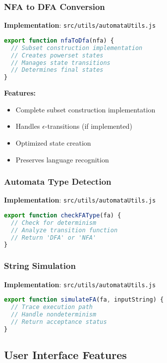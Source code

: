 \documentclass[12pt]{article}
\begin{document}
\subsubsection{NFA to DFA Conversion}
\textbf{Implementation}: \texttt{src/utils/automataUtils.js}
\begin{lstlisting}[language=JavaScript]
export function nfaToDfa(nfa) {
  // Subset construction implementation
  // Creates powerset states
  // Manages state transitions
  // Determines final states
}
\end{lstlisting}
\textbf{Features:}
\begin{itemize}
    \item Complete subset construction implementation
    \item Handles $\epsilon$-transitions (if implemented)
    \item Optimized state creation
    \item Preserves language recognition
\end{itemize}

\subsubsection{Automata Type Detection}
\textbf{Implementation}: \texttt{src/utils/automataUtils.js}
\begin{lstlisting}[language=JavaScript]
export function checkFAType(fa) {
  // Check for determinism
  // Analyze transition function
  // Return 'DFA' or 'NFA'
}
\end{lstlisting}

\subsubsection{String Simulation}
\textbf{Implementation}: \texttt{src/utils/automataUtils.js}
\begin{lstlisting}[language=JavaScript]
export function simulateFA(fa, inputString) {
  // Trace execution path
  // Handle nondeterminism
  // Return acceptance status
}
\end{lstlisting}

\subsection{User Interface Features}
\end{document}
